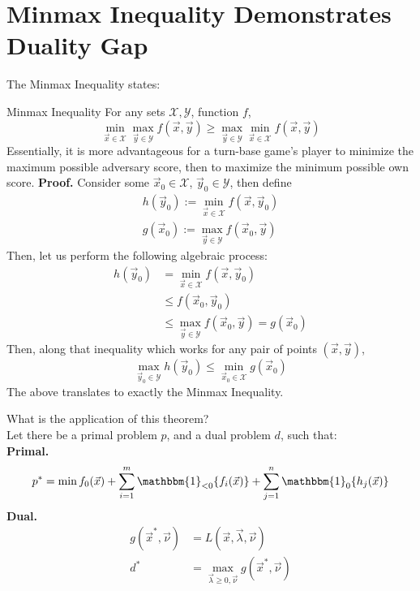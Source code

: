 \section{Minmax Inequality Demonstrates Duality Gap}
The Minmax Inequality states:
\begin{ln-theorem}{Minmax Inequality}{}
    For any sets $\mathcal{X}, \mathcal{Y}$, function $f$,
    \[
        \min_{\vec{x} \in \mathcal{X}} \max_{\vec{y} \in \mathcal{Y}} f(\vec{x}, \vec{y})
        \geq
        \max_{\vec{y} \in \mathcal{Y}} \min_{\vec{x} \in \mathcal{X}} f(\vec{x}, \vec{y})
    \]
    Essentially, it is more advantageous for a turn-base game's player to minimize the maximum possible adversary score, then to maximize the minimum possible own score.
    \tcblower
    \textbf{Proof.}
    Consider some $\vec{x}_0 \in \mathcal{X}$, $\vec{y}_0 \in \mathcal{Y}$, then define
    \begin{align*}
        h(\vec{y}_0) := \min_{\vec{x} \in \mathcal{X}} f(\vec{x}, \vec{y}_0) \\
        g(\vec{x}_0) := \max_{\vec{y} \in \mathcal{Y}} f(\vec{x}_0, \vec{y})
    \end{align*}
    Then, let us perform the following algebraic process:
    \begin{align*}
        h(\vec{y}_0)
        &= \min_{\vec{x} \in \mathcal{X}} f(\vec{x}, \vec{y}_0) \\
        &\leq f(\vec{x}_0, \vec{y}_0) \\
        &\leq \max_{\vec{y} \in \mathcal{Y}} f(\vec{x}_0, \vec{y}) = g(\vec{x}_0)
    \end{align*}
    Then, along that inequality which works for any pair of points $(\vec{x}, \vec{y})$,
    \[
        \max_{\vec{y}_0 \in \mathcal{Y}} h(\vec{y}_0) \leq \min_{\vec{x}_0 \in \mathcal{X}} g(\vec{x}_0)
    \]
    The above translates to exactly the Minmax Inequality.
\end{ln-theorem}

What is the application of this theorem? \\
Let there be a primal problem $p$, and a dual problem $d$, such that: \\
\textbf{Primal.}
\[
    p^* = \min f_0 (\vec{x}) + \sum_{i = 1}^m \mathbbm{1}_{<0} \{f_i(\vec{x})\} + \sum_{j = 1}^n \mathbbm{1}_{0} \{h_j(\vec{x})\}
\]
\textbf{Dual.}
\begin{align*}
    g(\vec{x}^*, \vec{\nu}) &= L(\vec{x}, \vec{\lambda}, \vec{\nu}) \\
    d^* &= \max_{\vec{\lambda} \geq 0, \vec{\nu}} g(\vec{x}^*, \vec{\nu})
\end{align*}

